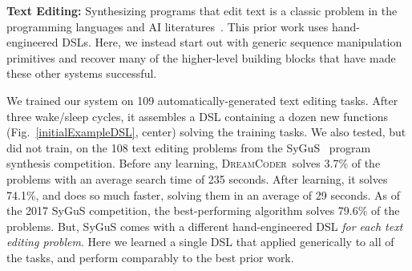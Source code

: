 \documentclass{article}
\newcommand{\system}{\textsc{DreamCoder}~}
\newcommand{\code}[1]{{\footnotesize\texttt{#1}}}
\newcommand{\probability}{\mathds{P}} %
\begin{document}
\textbf{Text Editing:} Synthesizing programs that edit text is a classic problem in the
programming languages and AI literatures~\cite{gulwani2011automating,lau2001programming}.
This prior work uses hand-engineered DSLs.
Here, we instead start out with generic sequence manipulation
primitives and recover many of the higher-level building blocks that 
have made these other systems successful.

We trained our system on 109 automatically-generated text editing tasks.
After three wake/sleep cycles, it assembles a DSL containing a dozen new functions (Fig.~\ref{initialExampleDSL}, center) solving
the training tasks.
We also tested, but did not train, on the 108 text editing problems from the SyGuS~\cite{alur2016sygus} program synthesis competition. Before any learning,
\system solves 3.7\% of the problems with an average search time of 235 seconds.
After learning,
it solves 74.1\%, and does so much faster,
solving them in an average of 29 seconds.
As of the 2017 SyGuS competition,
the best-performing algorithm solves 79.6\% of the problems.
But, SyGuS comes with a
different hand-engineered DSL \emph{for each text editing problem}. %
Here  we learned a single DSL
that applied generically to
all of the tasks,
and perform comparably to the best
prior work.
\end{document}
